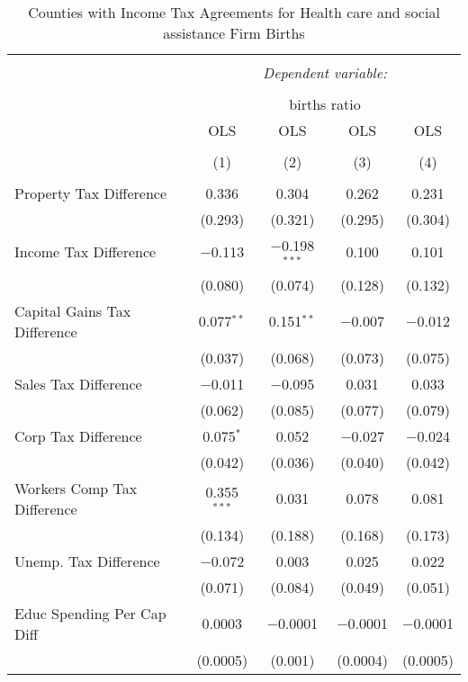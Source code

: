 
\begin{table}[!htbp] \centering 
  \caption{Counties with Income Tax Agreements for  Health care and social assistance Firm Births} 
  \label{62rd} 
\begin{tabular}{@{\extracolsep{5pt}}lcccc} 
\\[-1.8ex]\hline 
\hline \\[-1.8ex] 
 & \multicolumn{4}{c}{\textit{Dependent variable:}} \\ 
\cline{2-5} 
\\[-1.8ex] & \multicolumn{4}{c}{births ratio} \\ 
 & OLS & OLS & OLS & OLS \\ 
\\[-1.8ex] & (1) & (2) & (3) & (4)\\ 
\hline \\[-1.8ex] 
 Property Tax Difference & 0.336 & 0.304 & 0.262 & 0.231 \\ 
  & (0.293) & (0.321) & (0.295) & (0.304) \\ 
  Income Tax Difference & $-$0.113 & $-$0.198$^{***}$ & 0.100 & 0.101 \\ 
  & (0.080) & (0.074) & (0.128) & (0.132) \\ 
  Capital Gains Tax Difference & 0.077$^{**}$ & 0.151$^{**}$ & $-$0.007 & $-$0.012 \\ 
  & (0.037) & (0.068) & (0.073) & (0.075) \\ 
  Sales Tax Difference & $-$0.011 & $-$0.095 & 0.031 & 0.033 \\ 
  & (0.062) & (0.085) & (0.077) & (0.079) \\ 
  Corp Tax Difference & 0.075$^{*}$ & 0.052 & $-$0.027 & $-$0.024 \\ 
  & (0.042) & (0.036) & (0.040) & (0.042) \\ 
  Workers Comp Tax Difference & 0.355$^{***}$ & 0.031 & 0.078 & 0.081 \\ 
  & (0.134) & (0.188) & (0.168) & (0.173) \\ 
  Unemp. Tax Difference & $-$0.072 & 0.003 & 0.025 & 0.022 \\ 
  & (0.071) & (0.084) & (0.049) & (0.051) \\ 
  Educ Spending Per Cap Diff & 0.0003 & $-$0.0001 & $-$0.0001 & $-$0.0001 \\ 
  & (0.0005) & (0.001) & (0.0004) & (0.0005) \\ 

\end{tabular}
\end{table}
